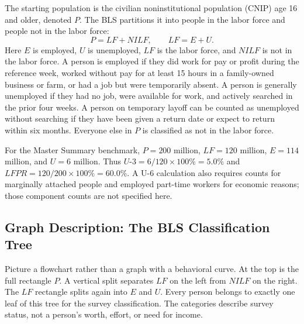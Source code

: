 \documentclass[11pt,letterpaper]{article}
\begin{document}
The starting population is the civilian noninstitutional population (CNIP) age 16 and older, denoted $P$. The BLS partitions it into people in the labor force and people not in the labor force:
\begin{equation}
P = LF + NILF, \qquad LF = E + U.
\end{equation}
Here $E$ is employed, $U$ is unemployed, $LF$ is the labor force, and $NILF$ is not in the labor force. A person is employed if they did work for pay or profit during the reference week, worked without pay for at least 15 hours in a family-owned business or farm, or had a job but were temporarily absent. A person is generally unemployed if they had no job, were available for work, and actively searched in the prior four weeks. A person on temporary layoff can be counted as unemployed without searching if they have been given a return date or expect to return within six months. Everyone else in $P$ is classified as not in the labor force.

\begin{tcolorbox}[colback=blue!5!white,colframe=blue!75!black,title=\textbf{SSOT Benchmark: Population and Headline Rates}]
For the Master Summary benchmark, $P=200$ million, $LF=120$ million, $E=114$ million, and $U=6$ million. Thus $U$-$3=6/120\times100\%=5.0\%$ and $LFPR=120/200\times100\%=60.0\%$. A U-6 calculation also requires counts for marginally attached people and employed part-time workers for economic reasons; those component counts are not specified here.
\end{tcolorbox}

\subsection{Graph Description: The BLS Classification Tree}
Picture a flowchart rather than a graph with a behavioral curve. At the top is the full rectangle $P$. A vertical split separates $LF$ on the left from $NILF$ on the right. The $LF$ rectangle splits again into $E$ and $U$. Every person belongs to exactly one leaf of this tree for the survey classification. The categories describe survey status, not a person's worth, effort, or need for income.
\end{document}

